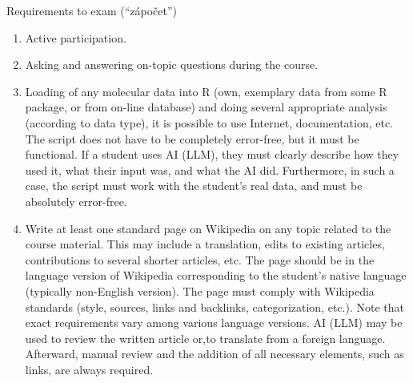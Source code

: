 \documentclass[compress, xelatex, 11pt, xcolor=svgnames, aspectratio=169, url={hyphens, lowtilde}]{beamer}
\begin{document}
\begin{frame}[allowframebreaks]{Requirements to exam (\enquote{zápočet})}
	\begin{enumerate}
		\item Active participation.
		\item Asking and answering on-topic questions during the course.
		\item Loading of any molecular data into R (own, exemplary data from some R package, or from on-line database) and doing several appropriate analysis (according to data type), it is possible to use Internet, documentation, etc. The script does not have to be completely error-free, but it must be functional. If a student uses AI (LLM), they must clearly describe how they used it, what their input was, and what the AI did. Furthermore, in such a case, the script must work with the student’s real data, and must be absolutely error-free.
		\item Write at least one standard page on Wikipedia on any topic related to the course material. This may include a translation, edits to existing articles, contributions to several shorter articles, etc. The page should be in the language version of Wikipedia corresponding to the student’s native language (typically non-English version). The page must comply with Wikipedia standards (style, sources, links and backlinks, categorization, etc.). Note that exact requirements vary among various language versions. AI (LLM) may be used to review the written article or,to translate from a foreign language. Afterward, manual review and the addition of all necessary elements, such as links, are always required.
	\end{enumerate}
\end{frame}
\end{document}
